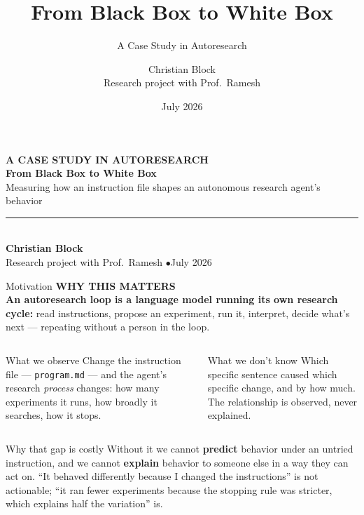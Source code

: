 \documentclass[aspectratio=169,11pt]{beamer}
\title{From Black Box to White Box}
\subtitle{A Case Study in Autoresearch}
\author{Christian Block \\ \small Research project with Prof.\ Ramesh}
\date{July 2026}
\newcommand{\kicker}[1]{{\scriptsize\bfseries\color{accentDk}\MakeUppercase{#1}}\\[2pt]}
\begin{document}
{
\begin{frame}[plain]
\vspace{4mm}
{\scriptsize\bfseries\color{accent}\MakeUppercase{A case study in autoresearch}}\\[10pt]
{\Huge\bfseries\color{white} From Black Box \color{mute!40!white}to White Box}\\[10pt]
{\large\color{white!80!black} Measuring how an instruction file shapes an autonomous research agent's behavior}\\[18pt]
{\color{accent}\rule{2.2cm}{1pt}}\\[10pt]
{\bfseries\color{white} Christian Block}\\
{\small\color{white!60!black} Research project with Prof.\ Ramesh \quad$\bullet$\quad July 2026}
\end{frame}
}

\begin{frame}{Motivation}
\kicker{Why this matters}
\small\textbf{An autoresearch loop is a language model running its own research cycle:} read instructions, propose an experiment, run it, interpret, decide what's next --- repeating without a person in the loop.
\vspace{2.5mm}

\begin{columns}[T,onlytextwidth]
\begin{block}{\small What we observe}
\footnotesize
Change the instruction file --- \texttt{program.md} --- and the agent's research \emph{process} changes: how many experiments it runs, how broadly it searches, how it stops.
\end{block}
\begin{block}{\small What we don't know}
\footnotesize
Which specific sentence caused which specific change, and by how much. The relationship is observed, never explained.
\end{block}
\end{columns}
\vspace{1.5mm}

\begin{block}{\small Why that gap is costly}
\footnotesize
Without it we cannot \textbf{predict} behavior under an untried instruction, and we cannot \textbf{explain} behavior to someone else in a way they can act on. ``It behaved differently because I changed the instructions'' is not actionable; ``it ran fewer experiments because the stopping rule was stricter, which explains half the variation'' is.
\end{block}
\end{frame}
\end{document}
